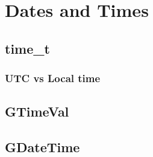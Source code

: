 \chapter{Dates and Times}

\section{time\_t}
\subsection{UTC vs Local time}

\section{GTimeVal}

\section{GDateTime}
